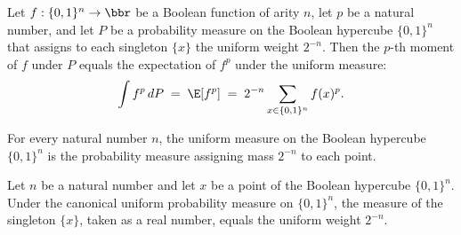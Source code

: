 \begin{lemma}
\leanok
{}
\label{BooleanAnalysis.Hypercontractivity.moment_eq_expect}
Let $f : \{0,1\}^n \to \bbr$ be a Boolean function of arity $n$, let $p$ be a natural
number, and let $P$ be a probability measure on the Boolean hypercube $\{0,1\}^n$ that
assigns to each singleton $\{x\}$ the uniform weight $2^{-n}$. Then the $p$-th moment of
$f$ under $P$ equals the expectation of $f^p$ under the uniform measure:
\[
  \int f^p \, dP \;=\; \E\!\left[f^p\right] \;=\; 2^{-n}\sum_{x\in\{0,1\}^n} f(x)^p.
\]
\end{lemma}

\begin{definition}
\leanok
{}
\label{BooleanAnalysis.Hypercontractivity.uniformMeasure}
For every natural number $n$, the uniform measure on the Boolean hypercube
$\{0,1\}^n$ is the probability measure assigning mass $2^{-n}$ to each point.
\end{definition}

\begin{lemma}
\leanok
{}
\label{BooleanAnalysis.Hypercontractivity.uniformMeasure_apply}
Let $n$ be a natural number and let $x$ be a point of the Boolean hypercube $\{0,1\}^n$.
Under the canonical uniform probability measure on $\{0,1\}^n$, the measure of the
singleton $\{x\}$, taken as a real number, equals the uniform weight $2^{-n}$.
\end{lemma}

